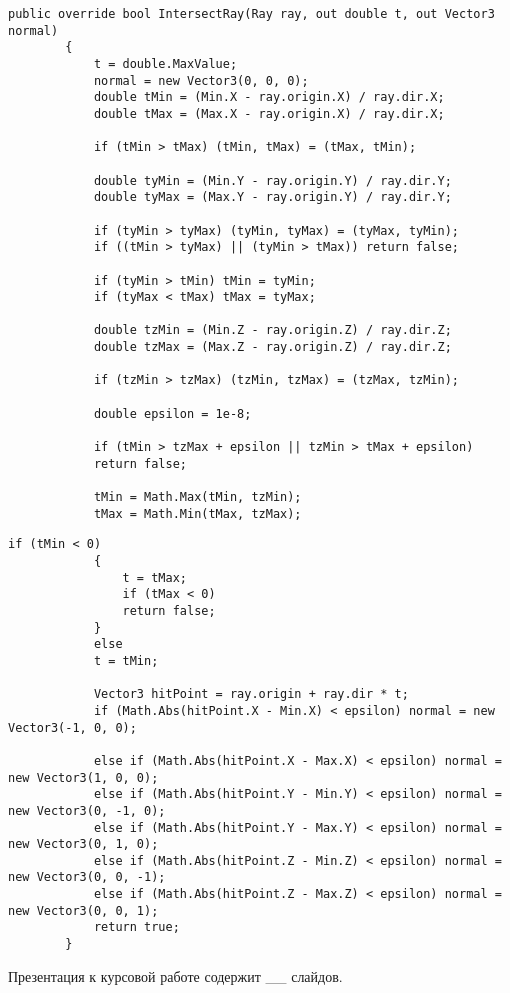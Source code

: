 \begin{center}
	\begin{lstlisting}[label={lst:CubeIntersection}, caption={Алгоритм поиска точки пересечения луча с кубом (начало)}]
		public override bool IntersectRay(Ray ray, out double t, out Vector3 normal)
		{
			t = double.MaxValue;
			normal = new Vector3(0, 0, 0);
			double tMin = (Min.X - ray.origin.X) / ray.dir.X;
			double tMax = (Max.X - ray.origin.X) / ray.dir.X;
			
			if (tMin > tMax) (tMin, tMax) = (tMax, tMin);
			
			double tyMin = (Min.Y - ray.origin.Y) / ray.dir.Y;
			double tyMax = (Max.Y - ray.origin.Y) / ray.dir.Y;
			
			if (tyMin > tyMax) (tyMin, tyMax) = (tyMax, tyMin);
			if ((tMin > tyMax) || (tyMin > tMax)) return false;
			
			if (tyMin > tMin) tMin = tyMin;
			if (tyMax < tMax) tMax = tyMax;
			
			double tzMin = (Min.Z - ray.origin.Z) / ray.dir.Z;
			double tzMax = (Max.Z - ray.origin.Z) / ray.dir.Z;
			
			if (tzMin > tzMax) (tzMin, tzMax) = (tzMax, tzMin);
			
			double epsilon = 1e-8;
			
			if (tMin > tzMax + epsilon || tzMin > tMax + epsilon)
			return false;
			
			tMin = Math.Max(tMin, tzMin);
			tMax = Math.Min(tMax, tzMax);
		\end{lstlisting}
	\end{center}	
	
	\setcounter{lstlisting}{0}
	\clearpage
	\begin{center}
		\begin{lstlisting}[label={lst:CubeIntersection}, caption={Алгоритм поиска точки пересечения луча с кубом (конец)}]
			if (tMin < 0)
			{
				t = tMax;
				if (tMax < 0) 
				return false;
			}
			else 
			t = tMin;
			
			Vector3 hitPoint = ray.origin + ray.dir * t;
			if (Math.Abs(hitPoint.X - Min.X) < epsilon) normal = new Vector3(-1, 0, 0);
			
			else if (Math.Abs(hitPoint.X - Max.X) < epsilon) normal = new Vector3(1, 0, 0);
			else if (Math.Abs(hitPoint.Y - Min.Y) < epsilon) normal = new Vector3(0, -1, 0);
			else if (Math.Abs(hitPoint.Y - Max.Y) < epsilon) normal = new Vector3(0, 1, 0);
			else if (Math.Abs(hitPoint.Z - Min.Z) < epsilon) normal = new Vector3(0, 0, -1);
			else if (Math.Abs(hitPoint.Z - Max.Z) < epsilon) normal = new Vector3(0, 0, 1);
			return true;
		}
	\end{lstlisting}
\end{center}

\clearpage

Презентация к курсовой работе содержит \_\_ слайдов.